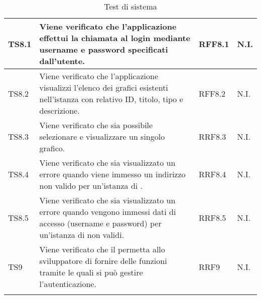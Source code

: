 \begin{longtabu}{| X[0.5] | X | X[0.5] | X[0.4] |}
TS8.1 & Viene verificato che l'applicazione effettui la chiamata al login mediante username e password specificati dall'utente. & RFF8.1 & N.I.\\ \hline

TS8.2 & Viene verificato che l'applicazione visualizzi l'elenco dei grafici esistenti nell'istanza  con relativo ID, titolo, tipo e descrizione. & RFF8.2 & N.I.\\ \hline

TS8.3 & Viene verificato che sia possibile selezionare e visualizzare un singolo grafico. & RRF8.3 & N.I.\\ \hline

TS8.4 & Viene verificato che sia visualizzato un errore quando viene immesso un indirizzo non valido per un'istanza di . & RRF8.4 & N.I.\\ \hline

TS8.5 & Viene verificato che sia visualizzato un errore quando vengono immessi dati di accesso (username e password) per un'istanza di  non validi. & RRF8.5 & N.I.\\ \hline

TS9 & Viene verificato che il  permetta allo sviluppatore di fornire delle funzioni tramite le quali si può gestire l'autenticazione. & RRF9 & N.I.\\ \hline

\caption{Test di sistema}

\end{longtabu}
